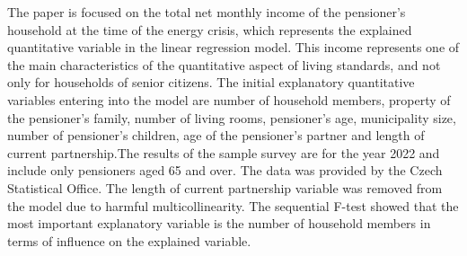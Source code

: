 
\begin{Abstrakt}
    The paper is focused on the total net monthly income of the pensioner's household at the time of the energy crisis, which represents the explained quantitative variable in the linear regression model. This income represents one of the main characteristics of the quantitative aspect of living standards, and not only for households of senior citizens. The initial explanatory quantitative variables entering into the model are number of household members, property of the pensioner's family, number of living rooms, pensioner's age, municipality size, number of pensioner's children, age of the pensioner's partner and length of current partnership.The results of the sample survey are for the year 2022 and include only pensioners aged 65 and over. The data was provided by the Czech Statistical Office. The length of current partnership variable was removed from the model due to harmful multicollinearity. The sequential F-test showed that the most important explanatory variable is the number of household members in terms of influence on the explained variable.
\end{Abstrakt}



\clearpage